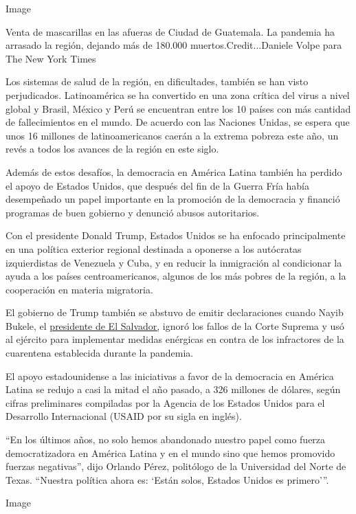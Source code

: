 Image

Venta de mascarillas en las afueras de Ciudad de Guatemala. La pandemia
ha arrasado la región, dejando más de 180.000 muertos.Credit...Daniele
Volpe para The New York Times

Los sistemas de salud de la región, en dificultades, también se han
visto perjudicados. Latinoamérica se ha convertido en una zona crítica
del virus a nivel global y Brasil, México y Perú se encuentran entre los
10 países con más cantidad de fallecimientos en el mundo. De acuerdo con
las Naciones Unidas, se espera que unos 16 millones de latinoamericanos
caerán a la extrema pobreza este año, un revés a todos los avances de la
región en este siglo.

Además de estos desafíos, la democracia en América Latina también ha
perdido el apoyo de Estados Unidos, que después del fin de la Guerra
Fría había desempeñado un papel importante en la promoción de la
democracia y financió programas de buen gobierno y denunció abusos
autoritarios.

Con el presidente Donald Trump, Estados Unidos se ha enfocado
principalmente en una política exterior regional destinada a oponerse a
los autócratas izquierdistas de Venezuela y Cuba, y en reducir la
inmigración al condicionar la ayuda a los países centroamericanos,
algunos de los más pobres de la región, a la cooperación en materia
migratoria.

El gobierno de Trump también se abstuvo de emitir declaraciones cuando
Nayib Bukele, el
\href{https://www.nytimes.com/es/2020/05/06/espanol/america-latina/bukele-el-salvador-virus.html}{presidente
de El Salvador,} ignoró los fallos de la Corte Suprema y usó al ejército
para implementar medidas enérgicas en contra de los infractores de la
cuarentena establecida durante la pandemia.

El apoyo estadounidense a las iniciativas a favor de la democracia en
América Latina se redujo a casi la mitad el año pasado, a 326 millones
de dólares, según cifras preliminares compiladas por la Agencia de los
Estados Unidos para el Desarrollo Internacional (USAID por su sigla en
inglés).

``En los últimos años, no solo hemos abandonado nuestro papel como
fuerza democratizadora en América Latina y en el mundo sino que hemos
promovido fuerzas negativas'', dijo Orlando Pérez, politólogo de la
Universidad del Norte de Texas. ``Nuestra política ahora es: `Están
solos, Estados Unidos es primero'''.

Image

